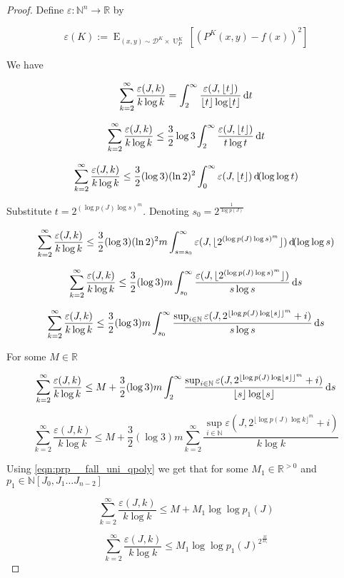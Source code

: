 \documentclass{article}
\numberwithin{equation}{section}
\theoremstyle{definition}
\theoremstyle{plain}
\DeclareMathOperator{\E}{E}
\DeclareMathOperator{\Un}{U}
\newcommand{\Nats}{\mathbb{N}}
\newcommand{\Reals}{\mathbb{R}}
\newcommand{\NatPolyJ}{\Nats[J_0, J_1 \ldots J_{n-2}]}
\newcommand{\Floor}[1]{\lfloor #1 \rfloor}
\newcommand{\Dist}{\mathcal{D}}
\begin{document}
\begin{proof}

Define ${\varepsilon: \Nats^n \rightarrow \Reals}$ by

\[\varepsilon(K):=\E_{(x,y) \sim \Dist^K \times \Un_P^K}[(P^K(x,y)-f(x))^2]\]

We have

\[\sum_{k=2}^\infty \frac{\varepsilon(J,k)}{k \log k}=\int_2^\infty \frac{\varepsilon(J,\Floor{t})}{\Floor{t} \log \Floor{t}} \dif t\]

\[\sum_{k=2}^\infty \frac{\varepsilon(J,k)}{k \log k} \leq \frac{3}{2} \log 3 \int_2^\infty \frac{\varepsilon(J,\Floor{t})}{t \log t} \dif t\]

\[\sum_{k=2}^\infty \frac{\varepsilon(J,k)}{k \log k} \leq \frac{3}{2} (\log 3) (\ln 2)^2 \int_0^\infty \varepsilon(J,\Floor{t}) \dif (\log \log t)\]

Substitute ${t=2^{(\log p(J) \log s)^m}}$. Denoting ${s_0=2^{\frac{1}{\log p(J)}}}$

\[\sum_{k=2}^\infty \frac{\varepsilon(J,k)}{k \log k} \leq \frac{3}{2} (\log 3) (\ln 2)^2 m \int_{s=s_0}^\infty \varepsilon(J,\Floor{2^{(\log p(J) \log s)^m}}) \dif (\log \log s)\]

\[\sum_{k=2}^\infty \frac{\varepsilon(J,k)}{k \log k} \leq \frac{3}{2} (\log 3) m \int_{s_0}^\infty \frac{\varepsilon(J,\Floor{2^{(\log p(J) \log s)^m}})}{s \log s} \dif s\]

\[\sum_{k=2}^\infty \frac{\varepsilon(J,k)}{k \log k} \leq \frac{3}{2} (\log 3) m \int_{s_0}^\infty \frac{\sup_{i \in \Nats} \varepsilon(J,2^{\Floor{\log p(J) \log \Floor{s}}^m}+i)}{s \log s} \dif s\]

For some ${M \in \Reals}$

\[\sum_{k=2}^\infty \frac{\varepsilon(J,k)}{k \log k} \leq M + \frac{3}{2} (\log 3) m \int_{2}^\infty \frac{\sup_{i \in \Nats} \varepsilon(J,2^{\Floor{\log p(J) \log \Floor{s}}^m}+i)}{\Floor{s} \log \Floor{s}} \dif s\]

\[\sum_{k=2}^\infty \frac{\varepsilon(J,k)}{k \log k} \leq M + \frac{3}{2} (\log 3) m \sum_{k=2}^\infty \frac{\sup_{i \in \Nats} \varepsilon(J,2^{\Floor{\log p(J) \log k}^m}+i)}{k \log k}\]

Using \ref{eqn:prp__fall_uni_qpoly} we get that for some ${M_1 \in \Reals^{>0}}$ and ${p_1 \in \NatPolyJ}$

\[\sum_{k=2}^\infty \frac{\varepsilon(J,k)}{k \log k} \leq M + M_1 \log \log p_1(J)\]

\[\sum_{k=2}^\infty \frac{\varepsilon(J,k)}{k \log k} \leq M_1 \log \log p_1(J)^{2^{\frac{M}{M_1}}}\]
%
\end{proof}
\end{document}
